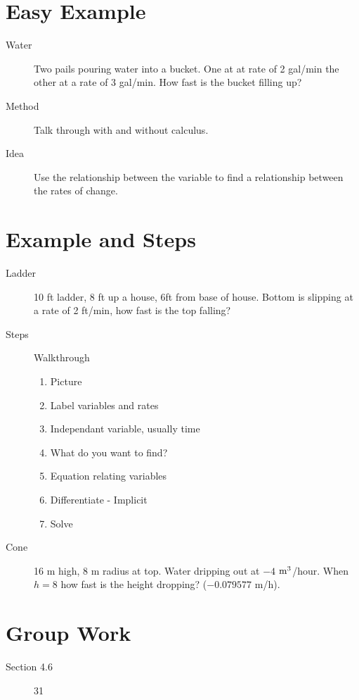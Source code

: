 \documentclass[11pt]{article}
\begin{document}
\drawtitle

\section*{Easy Example}
\begin{description}
\item[Water] Two pails pouring water into a bucket.  One at at rate of
  2 gal/min the other at a rate of 3 gal/min.  How fast is the bucket
  filling up?
\item[Method] Talk through with and without calculus.
\item[Idea] Use the relationship between the variable to find a
  relationship between the rates of change.
\end{description}

\section*{Example and Steps}
\begin{description}
\item[Ladder] 10 ft ladder, 8 ft up a house, 6ft from base of house.
  Bottom is slipping at a rate of 2 ft/min, how fast is the top
  falling?
\item[Steps] Walkthrough
  \begin{enumerate}
  \item Picture
  \item Label variables and rates
  \item Independant variable, usually time
  \item What do you want to find?
  \item Equation relating variables
  \item Differentiate - Implicit
  \item Solve
  \end{enumerate}

\item[Cone] 16 m high, 8 m radius at top.  Water dripping out at $-4$
  $\rm{m}^3$/hour.  When $h=8$ how fast is the height dropping?
  ($-0.079577$ m/h).

\end{description}




\section*{Group Work}
\begin{description}
\item[Section 4.6] 31
\end{description}
\end{document}
